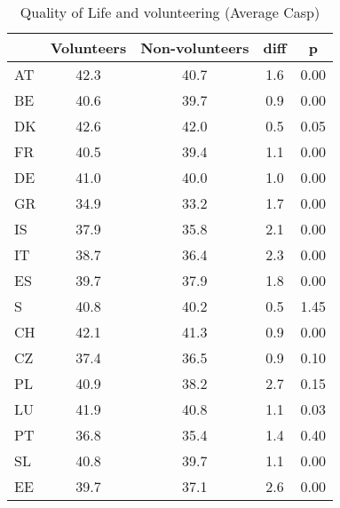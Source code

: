 \begin{table}[H]
\caption{\label{clabel} Quality of Life and volunteering (Average Casp)}\centering\medskip
\begin{tabular}{lcccc} \hline \hline
 & Volunteers  & Non-volunteers  & diff  & p  \\  \hline 
AT &      42.3 &      40.7 &       1.6 &      0.00 \\  
BE &      40.6 &      39.7 &       0.9 &      0.00 \\  
DK &      42.6 &      42.0 &       0.5 &      0.05 \\  
FR &      40.5 &      39.4 &       1.1 &      0.00 \\  
DE &      41.0 &      40.0 &       1.0 &      0.00 \\  
GR &      34.9 &      33.2 &       1.7 &      0.00 \\  
IS &      37.9 &      35.8 &       2.1 &      0.00 \\  
IT &      38.7 &      36.4 &       2.3 &      0.00 \\  
ES &      39.7 &      37.9 &       1.8 &      0.00 \\  
S &      40.8 &      40.2 &       0.5 &      1.45 \\  
CH &      42.1 &      41.3 &       0.9 &      0.00 \\  
CZ &      37.4 &      36.5 &       0.9 &      0.10 \\  
PL &      40.9 &      38.2 &       2.7 &      0.15 \\  
LU &      41.9 &      40.8 &       1.1 &      0.03 \\  
PT &      36.8 &      35.4 &       1.4 &      0.40 \\  
SL &      40.8 &      39.7 &       1.1 &      0.00 \\  
EE &      39.7 &      37.1 &       2.6 &      0.00 \\  
\hline \hline \end{tabular}
\end{table}
